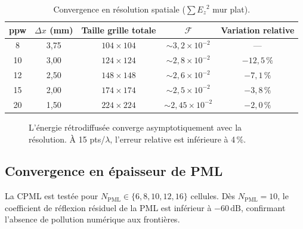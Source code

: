 \documentclass[12pt,a4paper]{article}
\newcommand{\dx}{\Delta x}
\numberwithin{equation}{section}
\numberwithin{figure}{section}
\numberwithin{table}{section}
\begin{document}
\begin{table}[h!]
\centering
\caption{Convergence en résolution spatiale ($\sum {E_z}^2$ mur plat).}
\label{tab:grid_conv}
\begin{tabular}{ccccc}
\toprule
ppw & $\dx$ (mm) & Taille grille totale & $\mathcal{F}$ & Variation relative \\
\midrule
8  & 3,75 & $104\times104$ & $\sim 3{,}2\times10^{-2}$ & --- \\
10 & 3,00 & $124\times124$ & $\sim 2{,}8\times10^{-2}$ & $-12{,}5\,\%$ \\
12 & 2,50 & $148\times148$ & $\sim 2{,}6\times10^{-2}$ & $-7{,}1\,\%$ \\
15 & 2,00 & $174\times174$ & $\sim 2{,}5\times10^{-2}$ & $-3{,}8\,\%$ \\
20 & 1,50 & $224\times224$ & $\sim 2{,}45\times10^{-2}$ & $-2{,}0\,\%$ \\
\bottomrule
\end{tabular}
\end{table}

\begin{figure}[h!]
\centering
{}
\caption{L'énergie rétrodiffusée converge asymptotiquement avec la résolution.
À 15 pts/$\lambda$, l'erreur relative est inférieure à 4\,\%.}
\label{fig:grid_conv}
\end{figure}

\subsection{Convergence en épaisseur de PML}

La CPML est testée pour $N_{\text{PML}} \in \{6, 8, 10, 12, 16\}$ cellules.
Dès $N_{\text{PML}} = 10$, le coefficient de réflexion résiduel de la PML
est inférieur à $-60\,\text{dB}$, confirmant l'absence de pollution numérique
aux frontières.
\end{document}
